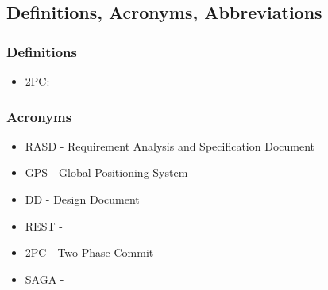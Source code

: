 \subsection{Definitions, Acronyms, Abbreviations}

\subsubsection{Definitions}
\begin{itemize}
\item 2PC: 
\end{itemize}

\subsubsection{Acronyms}
\begin{itemize}
\item RASD - Requirement Analysis and Specification Document
\item GPS - Global Positioning System
\item DD - Design Document
\item REST - 
\item 2PC - Two-Phase Commit
\item SAGA - 
\end{itemize}
